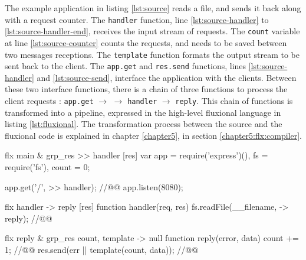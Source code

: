 
The example application in listing \ref{lst:source} reads a file, and sends it back along with a request counter.
The \texttt{handler} function, line \ref{lst:source-handler} to \ref{lst:source-handler-end}, receives the input stream of requests.
The \texttt{count} variable at line \ref{lst:source-counter} counts the requests, and needs to be saved between two messages receptions.
The \texttt{template} function formats the output stream to be sent back to the client.
The \texttt{app.get} and \texttt{res.send} functions, lines \ref{lst:source-handler} and \ref{lst:source-send}, interface the application with the clients.
Between these two interface functions, there is a chain of three functions to process the client requests : \texttt{app.get} $\to$ \hspace{-1.4em} $\to$ \texttt{handler} $\to$ \texttt{reply}.
This chain of functions is transformed into a pipeline, expressed in the high-level fluxional language in listing \ref{lst:fluxional}.
The transformation process between the source and the fluxional code is explained in chapter \ref{chapter5}, in section \ref{chapter5:flx:compiler}.

\begin{code}[flx, caption={Example application expressed in the high-level fluxional language}, label={lst:fluxional}]
flx main & grp_res
>> handler [res]
  var app = require('express')(),
      fs = require('fs'),
      count = 0;

  app.get('/', >> handler); //@\label{lst:fluxional-streamtohandler}@
  app.listen(8080);

flx handler
-> reply [res]
  function handler(req, res) {
    fs.readFile(__filename, -> reply); //@\label{lst:fluxional-readfile}@
  }

flx reply & grp_res {count, template}
-> null
  function reply(error, data) {
    count += 1; //@\label{lst:fluxional-counter}@
    res.send(err || template(count, data)); //@\label{lst:fluxional-ressend}@
  }
\end{code}

